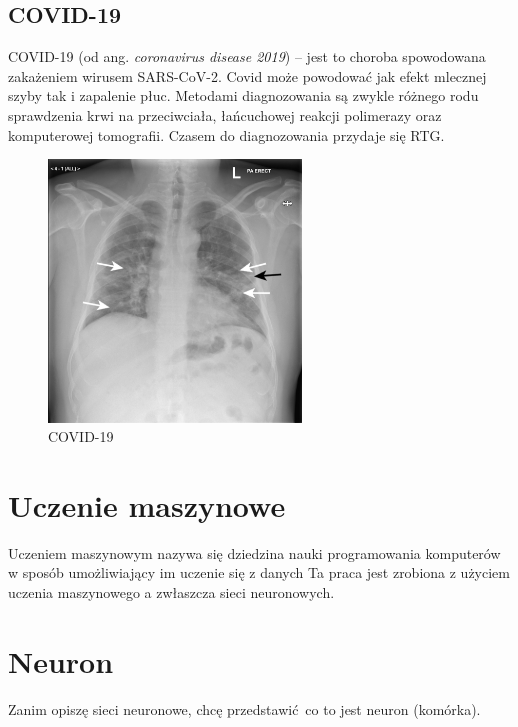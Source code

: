\documentclass{article}
\begin{document}
\subsection{COVID-19}
COVID-19 (od ang. \textit{coronavirus disease 2019}) – jest to choroba spowodowana zakażeniem wirusem SARS-CoV-2. Covid może powodować jak efekt mlecznej szyby tak i zapalenie płuc. Metodami diagnozowania są zwykle różnego rodu sprawdzenia krwi na przeciwciała, łańcuchowej reakcji polimerazy oraz komputerowej tomografii. Czasem do diagnozowania przydaje się RTG.

\begin{figure}[H]
	\centering
	\includegraphics[width=0.6\textwidth,keepaspectratio=true]{covid}
	\caption{
		COVID-19
	}
\end{figure}

\section{Uczenie maszynowe}
Uczeniem maszynowym nazywa się dziedzina nauki programowania komputerów w sposób umożliwiający im uczenie się z danych \cite{geron} 
Ta praca jest zrobiona z użyciem uczenia maszynowego a zwłaszcza sieci neuronowych.


\section{Neuron}
Zanim opiszę sieci neuronowe, chcę przedstawić co to jest neuron (komórka).
\end{document}
